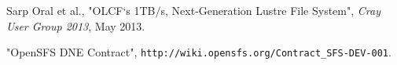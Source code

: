 \documentclass[conference,compsoc]{IEEEtran}
\begin{document}


%
%
%
\begin{thebibliography}{1}

Sarp Oral et al., "OLCF`s 1TB$/$s, Next-Generation Lustre File System", \emph{Cray User Group 2013}, May 2013.

"OpenSFS DNE Contract", \texttt{http://wiki.opensfs.org/Contract\_SFS-DEV-001}.

\end{thebibliography}


\end{document}
